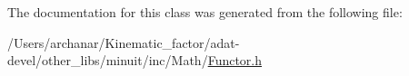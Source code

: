 The documentation for this class was generated from the following file\+:\begin{DoxyCompactItemize}
\item 
/\+Users/archanar/\+Kinematic\+\_\+factor/adat-\/devel/other\+\_\+libs/minuit/inc/\+Math/\mbox{\hyperlink{adat-devel_2other__libs_2minuit_2inc_2Math_2Functor_8h}{Functor.\+h}}\end{DoxyCompactItemize}
